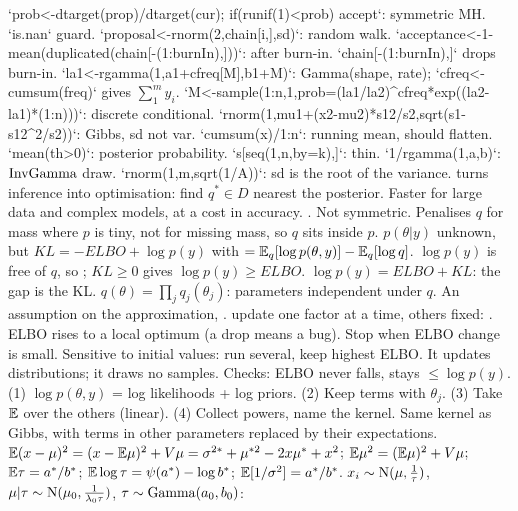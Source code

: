\bx
{}\par
\li`prob<-dtarget(prop)/dtarget(cur); if(runif(1)<prob) accept`: symmetric MH. `is.nan` guard. `proposal<-rnorm(2,chain[i,],sd)`: random walk.
\li`acceptance<-1-mean(duplicated(chain[-(1:burnIn),]))`: after burn-in. `chain[-(1:burnIn),]` drops burn-in.
\li`la1<-rgamma(1,a1+cfreq[M],b1+M)`: Gamma(shape, rate); `cfreq<-cumsum(freq)` gives $\sum_1^my_i$.
\li`M<-sample(1:n,1,prob=(la1/la2)^cfreq*exp((la2-la1)*(1:n)))`: discrete conditional.
\li`rnorm(1,mu1+(x2-mu2)*s12/s2,sqrt(s1-s12^2/s2))`: Gibbs, sd not var.
\li`cumsum(x)/1:n`: running mean, should flatten. `mean(th>0)`: posterior probability. `s[seq(1,n,by=k),]`: thin.
\li`1/rgamma(1,a,b)`: $\mathrm{InvGamma}$ draw. `rnorm(1,m,sqrt(1/A))`: sd is the root of the variance.
 turns inference into optimisation: find $q^*\in D$ nearest the posterior. Faster for large data and complex models, at a cost in accuracy.
\sk{} . Not symmetric. Penalises $q$ for mass where $p$ is tiny, not for missing mass, so $q$ sits inside $p$.
\sk{} $p(\theta|y)$ unknown, but $KL=-ELBO+\log p(y)$ with
$=\mathbb{E}_q[\log p(\theta,y)]-\mathbb{E}_q[\log q]$. $\log p(y)$ is free of $q$, so ; $KL\ge0$ gives $\log p(y)\ge ELBO$. $\log p(y)=ELBO+KL$: the gap is the KL.
\sk{} $q(\theta)=\prod_jq_j(\theta_j)$: parameters independent under $q$. An assumption on the approximation, .
\sk{} update one factor at a time, others fixed: . ELBO rises to a local optimum (a drop means a bug). Stop when ELBO change is small. Sensitive to initial values: run several, keep highest ELBO. It updates distributions; it draws no samples. Checks: ELBO never falls, stays $\le\log p(y)$.
\sk{} (1) $\log p(\theta,y)$ = log likelihoods + log priors. (2) Keep terms with $\theta_j$. (3) Take $\mathbb{E}$ over the others (linear). (4) Collect powers, name the kernel. Same kernel as Gibbs, with terms in other parameters replaced by their expectations.
\sk{} $\mathbb{E}(x-\mu)^2=(x-\mathbb{E}\mu)^2+V\mu=\sigma^{2*}+\mu^{*2}-2x\mu^*+x^2$; $\mathbb{E}\mu^2=(\mathbb{E}\mu)^2+V\mu$; $\mathbb{E}\tau=a^*/b^*$; $\mathbb{E}\log\tau=\psi(a^*)-\log b^*$; $\mathbb{E}[1/\sigma^2]=a^*/b^*$. 
\sk{} $x_i\sim\mathrm{N}(\mu,\frac1\tau)$, $\mu|\tau\sim\mathrm{N}(\mu_0,\frac1{\lambda_0\tau})$, $\tau\sim\mathrm{Gamma}(a_0,b_0)$:
